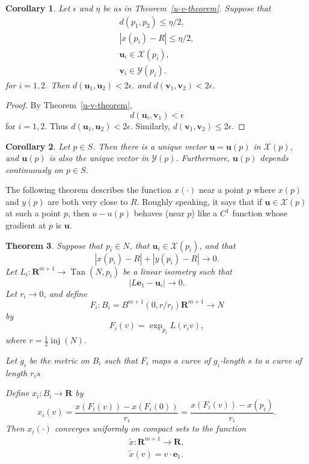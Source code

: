 \documentclass{amsart}
\newcommand{\inj}{\operatorname{inj}}    %
\newcommand{\RR}{\mathbf{R}}  %
\newcommand{\eps}{\epsilon}
\newcommand{\Tan}{\operatorname{Tan}}
\newcommand{\Xx}{\mathcal{X}}
\newcommand{\Yy}{\mathcal{Y}}
\newcommand{\vv}{\mathbf v}
\newcommand{\ee}{\mathbf e}
\newcommand{\uu}{\mathbf{u}}
\newtheorem{theorem}    {Theorem}   %
\newtheorem{corollary}  [theorem]     {Corollary}
\theoremstyle{definition}
\theoremstyle{definition}
\begin{document}
\begin{corollary}\label{u-v-corollary}
Let $\eps$ and $\eta$ be as in Theorem~\ref{u-v-theorem}.
Suppose that 
\begin{gather*}
d(p_1,p_2) \le \eta/2, \\
|x(p_i) -R| \le \eta/2, \\
\uu_i\in \Xx(p_i),\\
\vv_i\in \Yy(p_i).
\end{gather*}
for $i=1,2$.
Then
$
  d(\uu_1, \uu_2) < 2\eps.
$
and $d(\vv_1,\vv_2)< 2\eps$.
\end{corollary}

\begin{proof}
By Theorem~\ref{u-v-theorem},
\[
  d(\uu_i,\vv_1) < \eps
\]
for $i=1,2$. Thus
$
  d(\uu_1,\uu_2) < 2\eps.
$
Similarly, $d(\vv_1,\vv_2)\le 2\eps$.
\end{proof}


\begin{corollary}\label{unique-u-corollary}
Let $p\in S$.  Then there is a unique vector $\uu=\uu(p)$ in $\Xx(p)$,
and $\uu(p)$ is also the unique vector in $\Yy(p)$.
Furthermore, $\uu(p)$ depends continuously on $p\in S$.
\end{corollary}



The following theorem describes the function $x(\cdot)$ near
 a point $p$ where $x(p)$ and $y(p)$ are both very close to $R$.
 Roughly speaking, it says that if $\uu\in \Xx(p)$ at such a point $p$,
 then $u-u(p)$ behaves (near $p$) like a $C^1$ function
 whose gradient at $p$ is $\uu$.


\begin{theorem}\label{local-theorem}
Suppose that $p_i\in N$, that $\uu_i\in \Xx(p_i)$, and that
\[
  |x(p_i)-R| + |y(p_i) -R| \to 0.
\]
Let $L_i: \RR^{m+1}\to \Tan(N,p_i)$ be a linear isometry
such that 
\[
|L\ee_1 - \uu_i| \to 0.
\]
Let $r_i\to 0$, and define
\[
F_i: B_i = B^{m+1}(0,r/r_i) \RR^{m+1} \to N
\]
by
\[
 F_i(v) = \exp_{p_i} L (r_iv),
\]
where $r=\frac12 \inj(N)$.

Let $g_i$ be the metric on $B_i$ such that $F_i$ maps a curve of $g_i$-length $s$
to a curve of length $r_is$

Define $x_i: B_i\to \RR$ by
\[
x_i(v)
=
\frac{x(F_i(v)) - x(F_i(0))}{r_i} = \frac{x(F_i(v)) - x(p_i)}{r_i}.
\]
Then $x_i(\cdot)$ converges uniformly on compact sets to the function
\begin{align*}
\tilde x:\RR^{m+1}\to \RR, \\
\tilde x(v) = v\cdot \ee_1.
\end{align*}
\end{theorem}
\end{document}
